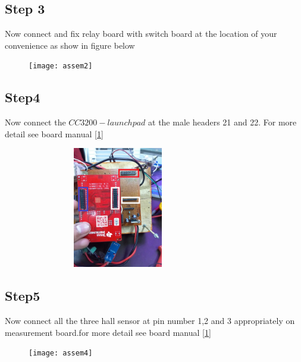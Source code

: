 \documentclass[a4paper,12pt,oneside]{book}
\begin{document}
\subsection*{Step 3}
Now connect and fix relay board with switch board at the location of your convenience as show in figure below
\begin{figure}[h]
	\texttt{[image: assem2]}
\end{figure}
\newpage
\subsection*{Step4}
Now connect the $CC3200-launchpad$ at the male headers 21 and 22. For more detail see board manual \autoref{1}
\begin{figure}[h]
	\includegraphics[width=300px,height=200px]{assem3}
\end{figure}
\subsection*{Step5}
Now connect all the three hall sensor at pin number 1,2 and 3 appropriately on measurement board.for more detail see board manual \autoref{1}
\begin{figure}[h]
	\texttt{[image: assem4]}
\end{figure}
\end{document}
